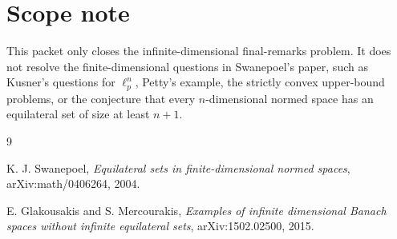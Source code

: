 \documentclass[11pt]{article}
\begin{document}
\section*{Scope note}

This packet only closes the infinite-dimensional final-remarks problem.
It does not resolve the finite-dimensional questions in Swanepoel's
paper, such as Kusner's questions for $\ell_p^n$, Petty's example, the
strictly convex upper-bound problems, or the conjecture that every
$n$-dimensional normed space has an equilateral set of size at least
$n+1$.

\begin{thebibliography}{9}

K. J. Swanepoel,
\emph{Equilateral sets in finite-dimensional normed spaces},
arXiv:math/0406264, 2004.

E. Glakousakis and S. Mercourakis,
\emph{Examples of infinite dimensional Banach spaces without infinite
equilateral sets},
arXiv:1502.02500, 2015.

\end{thebibliography}
\end{document}
